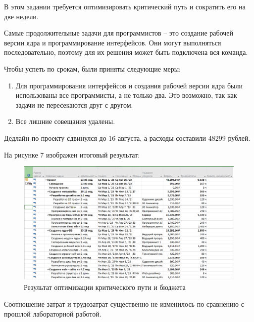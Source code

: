 \newpage
{}
В этом задании требуется оптимизировать критический путь и сократить его на две недели.

Самые продолжительные задачи для программистов -- это создание рабочей версии ядра и программирование интерфейсов.
Они могут выполняться последовательно, поэтому для их решения может быть подключена вся команда.

Чтобы успеть по срокам, были приняты следующие меры:
\begin{enumerate}
	\item Для программирования интерфейсов и создания рабочей версии ядра были использованы все программисты, а не только два. Это возможно, так как задачи не пересекаются друг с другом.
	\item Все лишние совещания удалены.
\end{enumerate}

Дедлайн по проекту сдвинулся до 16 августа, а расходы составили 48299 рублей.

На рисунке 7 изображен итоговый результат:
\FloatBarrier
\begin{figure}[h]	
	\begin{center}
		\includegraphics[width=\linewidth]{inc/result.png}
	\end{center}
	\captionsetup{justification=centering}
	\caption{Результат оптимизации критического пути и бюджета}
\end{figure}
\FloatBarrier 

Соотношение затрат и трудозатрат существенно не изменилось по сравнению с прошлой лабораторной работой.

